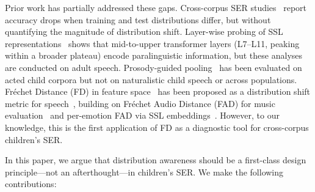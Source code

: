 \documentclass[11pt,a4paper]{article}
\begin{document}
Prior work has partially addressed these gaps. Cross-corpus SER
studies~\cite{schuller2010cross,latif2024cross} report accuracy drops when
training and test distributions differ, but without quantifying the magnitude
of distribution shift. Layer-wise probing of SSL
representations~\cite{pasad2021layer,upadhyay2024wavlm,chiu2025probing} shows that
mid-to-upper transformer layers (L7--L11, peaking within a broader plateau)
encode paralinguistic information, but these analyses are conducted on
adult speech. Prosody-guided pooling~\cite{triantafyllopoulos2023prosody} has
been evaluated on acted child corpora but not on naturalistic child speech or
across populations. Fr\'{e}chet Distance (FD) in feature
space~\cite{heusel2017gans} has been proposed as a distribution shift metric
for speech~\cite{le2024dist}, building on Fr\'echet Audio Distance (FAD) for
music evaluation~\cite{kilgour2018fad} and per-emotion FAD via SSL
embeddings~\cite{sun2024fad}. However, to our knowledge, this is the first
application of FD as a diagnostic tool for cross-corpus children's SER.

In this paper, we argue that distribution awareness should be a first-class
design principle---not an afterthought---in children's SER. We make the
following contributions:
\end{document}
